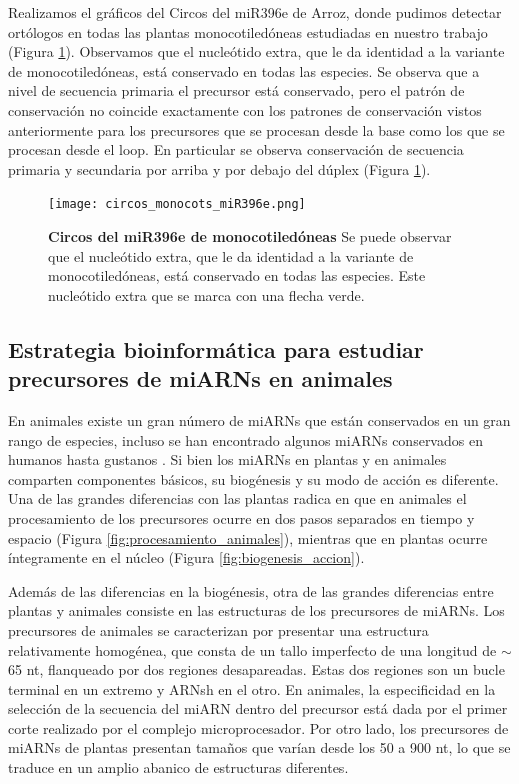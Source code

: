 Realizamos el gráficos del Circos del miR396e de Arroz, donde pudimos detectar ortólogos en todas las plantas monocotiledóneas estudiadas en nuestro trabajo (Figura \ref{fig:circos_monocots_miR396e}).
Observamos que el nucleótido extra, que le da identidad a la variante de monocotiledóneas, está conservado en todas las especies.
Se observa que a nivel de secuencia primaria el precursor está conservado, pero el patrón de conservación no coincide exactamente con los patrones de conservación vistos anteriormente para los precursores que se procesan desde la base como los que se procesan desde el loop.
En particular se observa conservación de secuencia primaria y secundaria por arriba y por debajo del dúplex (Figura \ref{fig:circos_monocots_miR396e}).

\begin{figure}[htbp!] 
    \centering    
    \texttt{[image: circos\_monocots\_miR396e.png]}
    \caption[Circos del miR172a]{
    \textbf{Circos del miR396e de monocotiledóneas}
    Se puede observar que el nucleótido extra, que le da identidad a la variante de monocotiledóneas, está conservado en todas las especies.
    Este nucleótido extra que se marca con una flecha verde.
    }
     \label{fig:circos_monocots_miR396e}
\end{figure}

\subsection{Estrategia bioinformática para estudiar precursores de miARNs en animales}

En animales existe un gran número de miARNs que están conservados en un gran rango de especies, incluso se han encontrado algunos miARNs conservados en humanos hasta gustanos \citep{pmid11081512}.
Si bien los miARNs en plantas y en animales comparten componentes básicos, su biogénesis y su modo de acción es diferente.
Una de las grandes diferencias con las plantas radica en que en animales el procesamiento de los precursores ocurre en dos pasos separados
en tiempo y espacio (Figura \ref{fig:procesamiento_animales}), mientras que en plantas ocurre íntegramente en el núcleo (Figura \ref{fig:biogenesis_accion}).

Además de las diferencias en la biogénesis, otra de las grandes diferencias entre plantas y animales consiste en las estructuras de los precursores de miARNs.
Los precursores de animales se caracterizan por presentar una estructura relativamente homogénea, que consta de un tallo imperfecto de una longitud de $\sim$65 nt, flanqueado por dos regiones desapareadas.
Estas dos regiones son un bucle terminal en un extremo y ARNsh en el otro.
En animales, la especificidad en la selección de la secuencia del miARN dentro del precursor está dada por el primer corte realizado por el complejo microprocesador.
Por otro lado, los precursores de miARNs de plantas presentan tamaños que varían desde los 50 a 900 nt, lo que se traduce en un amplio abanico de estructuras diferentes.

